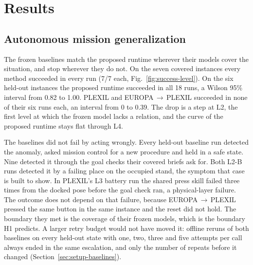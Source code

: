\providecommand{\TBD}[1]{\textcolor{red}{[TBD: #1]}}

\section{Results}
\label{sec:results}

\subsection{Autonomous mission generalization}
\label{sec:results-exp1}

The frozen baselines match the proposed runtime wherever their models cover the situation, and stop wherever they do
not. On the seven covered instances every method succeeded in every run (7/7 each, Fig.~\ref{fig:success-level}). On
the six held-out instances the proposed runtime succeeded in all 18 runs, a Wilson 95\% interval from 0.82 to 1.00.
PLEXIL and EUROPA\,$\rightarrow$\,PLEXIL succeeded in none of their six runs each, an interval from 0 to 0.39. The
drop is a step at L2, the first level at which the frozen model lacks a relation, and the curve of the proposed
runtime stays flat through L4.

The baselines did not fail by acting wrongly. Every held-out baseline run detected the anomaly, asked mission control
for a new procedure and held in a safe state. Nine detected it through the goal checks their covered briefs ask for.
Both L2-B runs detected it by a failing place on the occupied stand, the symptom that case is built to show. In
PLEXIL's L3 battery run the shared press skill failed three times from the docked pose before the goal check ran, a
physical-layer failure. The outcome does not depend on that failure, because EUROPA\,$\rightarrow$\,PLEXIL pressed
the same button in the same instance and the reset did not hold. The boundary they met is the coverage of their frozen models, which is the
boundary H1 predicts. A larger retry budget would not have moved it: offline reruns of both baselines on every
held-out state with one, two, three and five attempts per call always ended in the same escalation, and only the
number of repeats before it changed (Section~\ref{sec:setup-baselines}).

